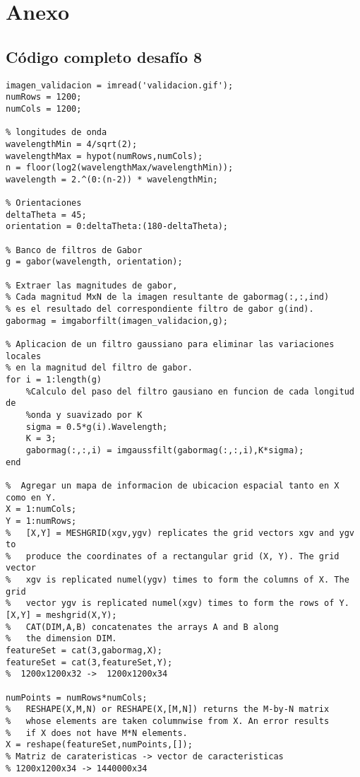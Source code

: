\documentclass[es,gi]{ifirak}\usepackage[]{graphicx}\usepackage[]{color}
\begin{document}
\pagebreak
\section{Anexo}
\subsection{Código completo desafío 8}
\begin{lstlisting}
imagen_validacion = imread('validacion.gif');
numRows = 1200;
numCols = 1200;

% longitudes de onda
wavelengthMin = 4/sqrt(2);
wavelengthMax = hypot(numRows,numCols);
n = floor(log2(wavelengthMax/wavelengthMin));
wavelength = 2.^(0:(n-2)) * wavelengthMin;

% Orientaciones
deltaTheta = 45;
orientation = 0:deltaTheta:(180-deltaTheta);

% Banco de filtros de Gabor
g = gabor(wavelength, orientation);

% Extraer las magnitudes de gabor,
% Cada magnitud MxN de la imagen resultante de gabormag(:,:,ind) 
% es el resultado del correspondiente filtro de gabor g(ind).
gabormag = imgaborfilt(imagen_validacion,g);

% Aplicacion de un filtro gaussiano para eliminar las variaciones locales
% en la magnitud del filtro de gabor.
for i = 1:length(g)
    %Calculo del paso del filtro gausiano en funcion de cada longitud de
    %onda y suavizado por K
    sigma = 0.5*g(i).Wavelength; 
    K = 3;
    gabormag(:,:,i) = imgaussfilt(gabormag(:,:,i),K*sigma); 
end

%  Agregar un mapa de informacion de ubicacion espacial tanto en X como en Y.
X = 1:numCols;
Y = 1:numRows;
%   [X,Y] = MESHGRID(xgv,ygv) replicates the grid vectors xgv and ygv to 
%   produce the coordinates of a rectangular grid (X, Y). The grid vector
%   xgv is replicated numel(ygv) times to form the columns of X. The grid 
%   vector ygv is replicated numel(xgv) times to form the rows of Y.
[X,Y] = meshgrid(X,Y);
%   CAT(DIM,A,B) concatenates the arrays A and B along
%   the dimension DIM.  
featureSet = cat(3,gabormag,X);
featureSet = cat(3,featureSet,Y);
%  1200x1200x32 ->  1200x1200x34

numPoints = numRows*numCols;
%   RESHAPE(X,M,N) or RESHAPE(X,[M,N]) returns the M-by-N matrix 
%   whose elements are taken columnwise from X. An error results 
%   if X does not have M*N elements.
X = reshape(featureSet,numPoints,[]);
% Matriz de carateristicas -> vector de caracteristicas
% 1200x1200x34 -> 1440000x34


\end{lstlisting}
\end{document}
